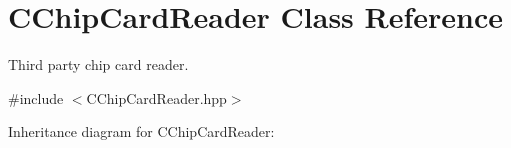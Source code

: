 \hypertarget{classCChipCardReader}{}\section{C\+Chip\+Card\+Reader Class Reference}
\label{classCChipCardReader}


Third party chip card reader.  




{\ttfamily \#include $<$C\+Chip\+Card\+Reader.\+hpp$>$}



Inheritance diagram for C\+Chip\+Card\+Reader\+:
